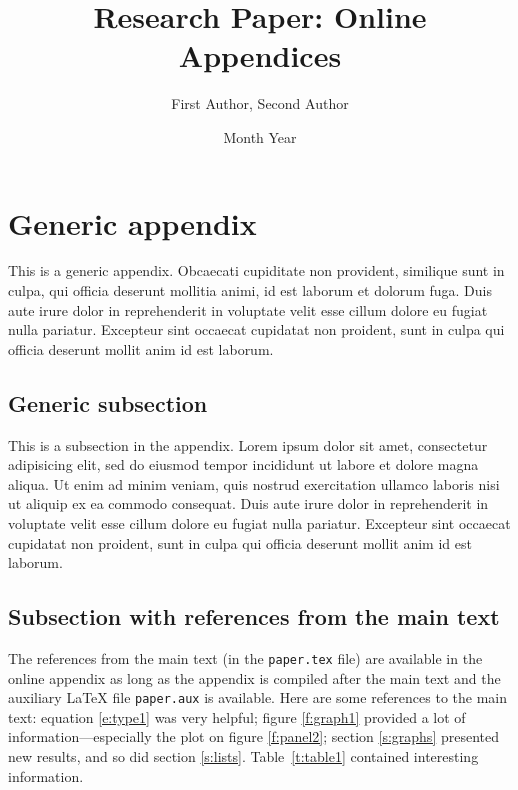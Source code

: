 \documentclass[letterpaper,11pt,leqno]{article}
\begin{document}
\title{Research Paper: Online Appendices}

\author{First Author, Second Author}

\date{Month Year}


\begin{titlepage}
\maketitle
\tableofcontents
\end{titlepage}

\section{Generic appendix}\label{a:appendix1}

This is a generic appendix. Obcaecati cupiditate non provident, similique sunt in culpa, qui officia deserunt mollitia animi, id est laborum et dolorum fuga. Duis aute irure dolor in reprehenderit in voluptate velit esse cillum dolore eu fugiat nulla pariatur. Excepteur sint occaecat cupidatat non proident, sunt in culpa qui officia deserunt mollit anim id est laborum. 

\subsection{Generic subsection} 

This is a subsection in the appendix. Lorem ipsum dolor sit amet, consectetur adipisicing elit, sed do eiusmod tempor incididunt ut labore et dolore magna aliqua. Ut enim ad minim veniam, quis nostrud exercitation ullamco laboris nisi ut aliquip ex ea commodo
consequat. Duis aute irure dolor in reprehenderit in voluptate velit esse
cillum dolore eu fugiat nulla pariatur. Excepteur sint occaecat cupidatat non
proident, sunt in culpa qui officia deserunt mollit anim id est laborum. 

\subsection{Subsection with references from the main text} 

The references from the main text (in the \texttt{paper.tex} file) are available in the online appendix as long as the appendix is compiled after the main text and the auxiliary LaTeX file \texttt{paper.aux} is available. Here are some references to the main text: equation \ref{e:type1} was very helpful; figure \ref{f:graph1} provided a lot of information---especially the plot on figure \ref{f:panel2}; section \ref{s:graphs} presented new results, and so did section \ref{s:lists}. Table~\ref{t:table1} contained interesting information.
\end{document}
